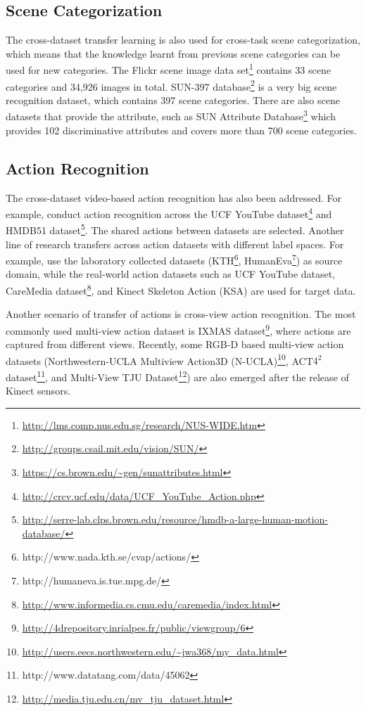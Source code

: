 \documentclass[prodmode]{acmsmall}  %
\begin{document}
\subsection{Scene Categorization}
The cross-dataset transfer learning is also used for cross-task scene categorization, which means that the knowledge learnt from previous scene categories can be used for new categories. The Flickr scene image data set\footnote{\url{http://lms.comp.nus.edu.sg/research/NUS-WIDE.htm}} contains 33 scene categories and 34,926 images in total. SUN-397 database\footnote{\url{http://groups.csail.mit.edu/vision/SUN/}} is a very big scene recognition dataset, which contains 397 scene categories. There are also scene datasets that provide the attribute, such as SUN Attribute Database\footnote{\url{https://cs.brown.edu/~gen/sunattributes.html}} which provides 102 discriminative attributes and covers more than 700 scene categories.
\subsection{Action Recognition}
The cross-dataset video-based action recognition has also been addressed. For example,  conduct action recognition across the UCF YouTube dataset\footnote{\url{http://crcv.ucf.edu/data/UCF_YouTube_Action.php}\label{note1}} and HMDB51 dataset\footnote{\url{http://serre-lab.clps.brown.edu/resource/hmdb-a-large-human-motion-database/}}. The shared actions between datasets are selected. Another line of research transfers across action datasets with different label spaces. For example,  use the laboratory collected datasets (KTH\footnote{http://www.nada.kth.se/cvap/actions/}, HumanEva\footnote{http://humaneva.is.tue.mpg.de/}) as source domain, while the real-world action datasets such as UCF YouTube dataset, CareMedia dataset\footnote{\url{http://www.informedia.cs.cmu.edu/caremedia/index.html}}, and Kinect Skeleton Action (KSA) are used for target data. 

Another scenario of transfer of actions is cross-view action recognition. The most commonly used multi-view action dataset is IXMAS dataset\footnote{\url{http://4drepository.inrialpes.fr/public/viewgroup/6}}, where actions are captured from different views. Recently, some RGB-D based multi-view action datasets (Northwestern-UCLA Multiview Action3D (N-UCLA)\footnote{\url{http://users.eecs.northwestern.edu/~jwa368/my_data.html}}, ACT$4^2$ dataset\footnote{http://www.datatang.com/data/45062}, and Multi-View TJU Dataset\footnote{\url{http://media.tju.edu.cn/mv_tju_dataset.html}}) are also emerged after the release of Kinect sensors. 
\end{document}
